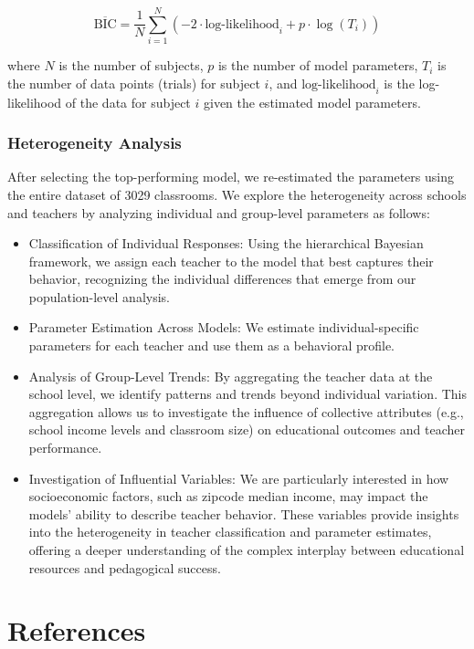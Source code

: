 \documentclass[
  number,
  preprint,
  3p,
  onecolumn]{elsarticle}
\begin{document}
\[
\overline{\text{BIC}} = \frac{1}{N} \sum_{i=1}^{N} \left( -2 \cdot \text{log-likelihood}_i + p \cdot \log(T_i) \right)
\]

where \(N\) is the number of subjects, \(p\) is the number of model
parameters, \(T_i\) is the number of data points (trials) for subject
\(i\), and \(\text{log-likelihood}_i\) is the log-likelihood of the data
for subject \(i\) given the estimated model parameters.

\subsubsection{Heterogeneity Analysis}\label{heterogeneity-analysis}

After selecting the top-performing model, we re-estimated the parameters
using the entire dataset of 3029 classrooms. We explore the
heterogeneity across schools and teachers by analyzing individual and
group-level parameters as follows:

\begin{itemize}
\item
  Classification of Individual Responses: Using the hierarchical
  Bayesian framework, we assign each teacher to the model that best
  captures their behavior, recognizing the individual differences that
  emerge from our population-level analysis.
\item
  Parameter Estimation Across Models: We estimate individual-specific
  parameters for each teacher and use them as a behavioral profile.
\item
  Analysis of Group-Level Trends: By aggregating the teacher data at the
  school level, we identify patterns and trends beyond individual
  variation. This aggregation allows us to investigate the influence of
  collective attributes (e.g., school income levels and classroom size)
  on educational outcomes and teacher performance.
\item
  Investigation of Influential Variables: We are particularly interested
  in how socioeconomic factors, such as zipcode median income, may
  impact the models' ability to describe teacher behavior. These
  variables provide insights into the heterogeneity in teacher
  classification and parameter estimates, offering a deeper
  understanding of the complex interplay between educational resources
  and pedagogical success.
\end{itemize}

\section{References}\label{references}
\end{document}
